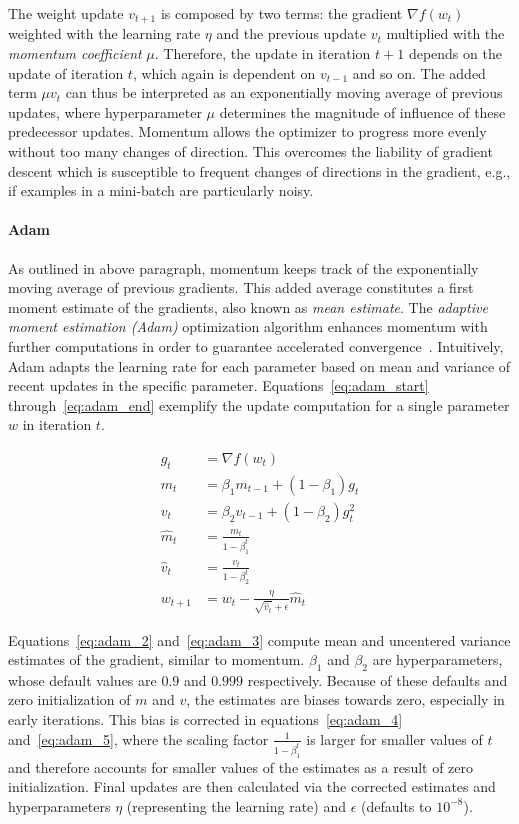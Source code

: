 The weight update $v_{t+1}$ is composed by two terms: the gradient $\nabla f(w_t)$
weighted with the learning rate $\eta$ and the previous update $v_t$ multiplied
with the \textit{momentum coefficient} $\mu$.
Therefore, the update in iteration $t+1$ depends on the update of iteration $t$,
which again is dependent on $v_{t-1}$ and so on.
The added term $\mu v_t$ can thus be interpreted as an exponentially moving 
average of previous updates, where hyperparameter $\mu$ determines the magnitude 
of influence of these predecessor updates.
Momentum allows the optimizer to progress more evenly without too many changes
of direction.
This overcomes the liability of gradient descent which is susceptible to
frequent changes of directions in the gradient, e.g., if examples in a mini-batch
are particularly noisy.

\paragraph{Adam}

As outlined in above paragraph, momentum keeps track of the exponentially moving
average of previous gradients.
This added average constitutes a first moment estimate of the gradients, also 
known as \textit{mean estimate}.
The \textit{adaptive moment estimation (Adam)} optimization algorithm enhances
momentum with further computations in order to guarantee accelerated
convergence~\cite{Kingma2014a}.
Intuitively, Adam adapts the learning rate for each parameter based on mean and
variance of recent updates in the specific parameter.
Equations~\ref{eq:adam_start} through~\ref{eq:adam_end} exemplify the update
computation for a single parameter $w$ in iteration $t$.

\begin{align}
  g_t &= \nabla f(w_t) \label{eq:adam_start} \\
  m_t &= \beta_1 m_{t-1} + (1-\beta_1) g_t \label{eq:adam_2} \\
  v_t &= \beta_2 v_{t-1} + (1-\beta_2) g_t^2 \label{eq:adam_3} \\
  \widehat{m}_t &= \frac{m_t}{1-\beta_1^t} \label{eq:adam_4} \\
  \widehat{v}_t &= \frac{v_t}{1-\beta_2^t} \label{eq:adam_5} \\
  w_{t+1} &= w_t - \frac{\eta}{\sqrt{\widehat{v}_t} + \epsilon} \widehat{m}_t \label{eq:adam_end}
\end{align}

Equations~\ref{eq:adam_2} and~\ref{eq:adam_3} compute mean and
uncentered variance estimates of the gradient, similar to momentum.
$\beta_1$ and $\beta_2$ are hyperparameters, whose default values are $0.9$ and
$0.999$ respectively.
Because of these defaults and zero initialization of $m$ and $v$, the estimates
are biases towards zero, especially in early iterations.
This bias is corrected in equations~\ref{eq:adam_4} and~\ref{eq:adam_5}, where
the scaling factor $\frac{1}{1-\beta_1^t}$ is larger for smaller values of $t$
and therefore accounts for smaller values of the estimates as a result of 
zero initialization.
Final updates are then calculated via the corrected estimates and hyperparameters
$\eta$ (representing the learning rate) and $\epsilon$ (defaults to $10^{-8}$).

